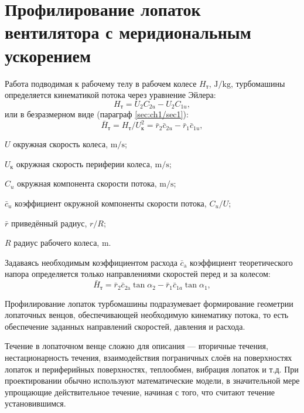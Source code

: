\section{Профилирование лопаток вентилятора с меридиональным ускорением}

Работа подводимая к рабочему телу в рабочем колесе \(H_\text{т}\), \(\si\joule/\si\kilogram\), турбомашины определяется кинематикой потока через уравнение Эйлера:
\begin{equation}
	H_\text{т} = U_2 C_{2u} - U_2 C_{1u},
	\label{eq:Ht}
\end{equation}
или в безразмерном виде (параграф \ref{sec:ch1/sec1}):
\begin{equation}
	\bar{H}_\text{т} = H_\text{т}/U_\text{к}^2 = \bar{r}_2 \bar{c}_{2u} - \bar{r}_1 \bar{c}_{1u},
	\label{eq:H_t}
\end{equation}
\begin{eqexpl}
	\item{\(U\)} окружная скорость колеса, \(\si\meter/\si\second\);
	\item{\(U_\text{к}\)} окружная скорость периферии колеса, \(\si\meter/\si\second\);
	\item{\(C_{u}\)} окружная компонента скорости потока, \(\si\meter/\si\second\);
	\item{\(\bar{c}_{u}\)} коэффициент окружной компоненты скорости потока, \(C_{u}/U\);
	\item{\(\bar{r}\)} приведённый радиус, \(r/R\);
	\item{\(R\)} радиус рабочего колеса, \(\si\meter\).
\end{eqexpl}
Задаваясь необходимым коэффициентом расхода \(\bar{c}_\text{a}\) коэффициент теоретического напора определяется только направлениями скоростей перед и за колесом:
\begin{equation}
	\bar{H}_\text{т} = \bar{r}_2 \bar{c}_\text{2a} \tan\alpha_2 - \bar{r}_1 \bar{c}_{1a} \tan\alpha_1,
	\label{eq:H_t_tan}
\end{equation}

Профилирование лопаток турбомашины подразумевает формирование геометрии лопаточных венцов, обеспечивающей необходимую кинематику потока, то есть обеспечение заданных направлений скоростей, давления и расхода. 

Течение в лопаточном венце сложно для описания –-- вторичные течения, нестационарность течения, взаимодействия пограничных слоёв на поверхностях лопаток и периферийных поверхностях, теплообмен, вибрация лопаток и т.д. При проектировании обычно используют математические модели, в значительной мере упрощающие действительное течение, начиная с того, что  считают течение установившимся.


